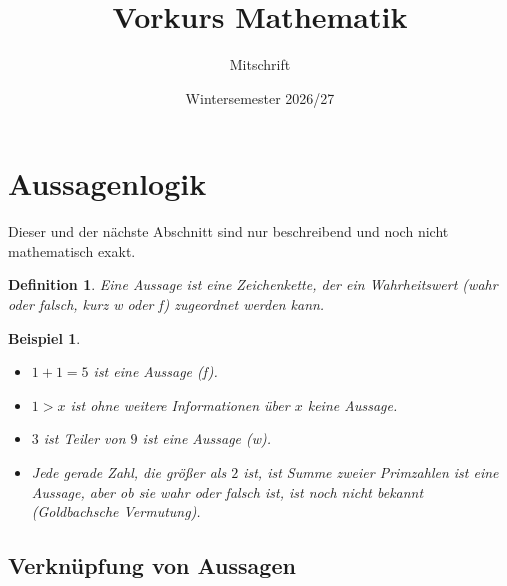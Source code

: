 \documentclass[a4paper]{article}
\title{Vorkurs Mathematik}
\author{Mitschrift}
\date{Wintersemester 2026/27}
\theoremstyle{kurzskript}
\newtheorem{definition}[satz]{Definition}
\newtheorem*{bsp}{Beispiel}
\newcommand{\w}{\textsf{w}}   %
\newcommand{\f}{\textsf{f}}   %
\begin{document}
\maketitle
\tableofcontents
\newpage

\section{Aussagenlogik}

Dieser und der nächste Abschnitt sind nur beschreibend und noch nicht mathematisch exakt.

\begin{definition}
Eine \emph{Aussage} ist eine Zeichenkette, der ein \emph{Wahrheitswert} (wahr oder falsch, kurz \w{} oder \f) zugeordnet werden kann.
\end{definition}

\begin{bsp}
\leavevmode
\begin{itemize}
  \item \glqq$1 + 1 = 5$\grqq{} ist eine Aussage (\f).
  \item \glqq$1 > x$\grqq{} ist ohne weitere Informationen über $x$ keine Aussage.
  \item \glqq$3$ ist Teiler von $9$\grqq{} ist eine Aussage (\w).
  \item \glqq Jede gerade Zahl, die größer als $2$ ist, ist Summe zweier Primzahlen\grqq{} ist eine Aussage, aber ob sie wahr oder falsch ist, ist noch nicht bekannt (\emph{Goldbachsche Vermutung}).
\end{itemize}
\end{bsp}

\subsection{Verknüpfung von Aussagen}
\end{document}
